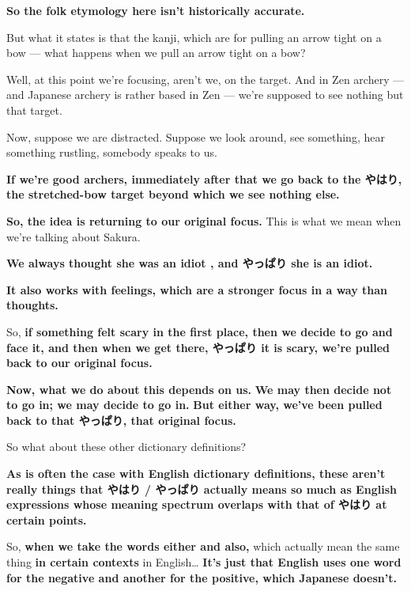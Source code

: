 {\bf So the folk etymology here isn't historically accurate.}

But what it states is that the kanji, which are for pulling an arrow tight on a bow --- what happens when we pull an arrow tight on a bow?

Well, at this point we're focusing, aren't we, on the target. And in Zen archery --- and Japanese archery is rather based in Zen --- we're supposed to see nothing but that target.

Now, suppose we are distracted. Suppose we look around, see something, hear something rustling, somebody speaks to us.

{\bf If we're good archers, immediately after that we go back to the やはり, the stretched-bow target beyond which we see nothing else.}

{\bf So, the idea is returning to our original focus.} This is what we mean when we're talking about Sakura.

{\bf We always thought she was an idiot , and やっぱり she is an idiot.}

{\bf It also works with feelings, which are a stronger focus in a way than thoughts.}

So, {\bf if something felt scary in the first place, then we decide to go and face it, and then when we get there, やっぱり it is scary, we're pulled back to our original focus.}

{}

{\bf Now, what we do about this depends on us.} {\bf We may then decide not to go in; we may decide to go in.} {\bf But either way, we've been pulled back to that やっぱり, that original focus.}

\thinrule

So what about these other dictionary definitions?

{}

{\bf As is often the case with English dictionary definitions, these aren't really things that やはり / やっぱり actually means so much as English expressions whose meaning spectrum overlaps with that of やはり at certain points.}

\thinrule

So, {\bf when we take the words either and also,} which actually mean the same thing {\bf in certain contexts} in English\ldots{} {\bf It's just that English uses one word for the negative and another for the positive, which Japanese doesn't.}

